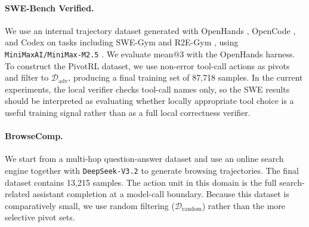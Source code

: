 \paragraph{SWE-Bench Verified.}
We use an internal trajectory dataset generated with OpenHands \citep{wang2025openhandsopenplatformai}, OpenCode \citep{opencode}, and Codex \citep{openaicodex_software} on tasks including SWE-Gym \citep{pan2025trainingsoftwareengineeringagents} and R2E-Gym \citep{jain2025r2egymproceduralenvironmentshybrid}, using \texttt{MiniMaxAI/MiniMax-M2.5} \citep{minimax2026m25}. We evaluate mean@3 with the OpenHands harness. To construct the PivotRL dataset, we use non-error tool-call actions as pivots and filter to $\mathcal{D}_{\mathrm{adv}}$, producing a final training set of 87{,}718 samples. In the current experiments, the local verifier checks tool-call names only, so the SWE results should be interpreted as evaluating whether locally appropriate tool choice is a useful training signal rather than as a full local correctness verifier.

\paragraph{BrowseComp.}
We start from a multi-hop question-answer dataset and use an online search engine together with \texttt{DeepSeek-V3.2} to generate browsing trajectories. The final dataset contains 13{,}215 samples. The action unit in this domain is the full search-related assistant completion at a model-call boundary. Because this dataset is comparatively small, we use random filtering ($\mathcal{D}_{\mathrm{random}}$) rather than the more selective pivot sets.

